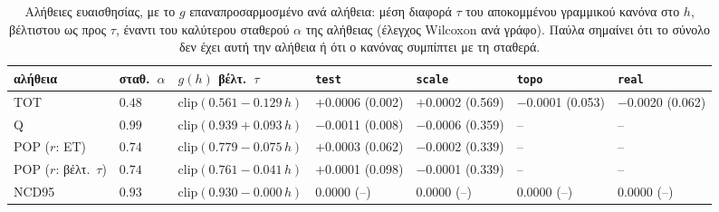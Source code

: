 \begin{table}[!htbp]
\centering
\footnotesize\setlength{\tabcolsep}{4pt}
\caption{Αλήθειες ευαισθησίας, με το $g$ επαναπροσαρμοσμένο ανά αλήθεια: μέση διαφορά $\tau$ του αποκομμένου γραμμικού κανόνα στο $h$, βέλτιστου ως προς $\tau$, έναντι του καλύτερου σταθερού $\alpha$ της αλήθειας (έλεγχος Wilcoxon ανά γράφο). Παύλα σημαίνει ότι το σύνολο δεν έχει αυτή την αλήθεια ή ότι ο κανόνας συμπίπτει με τη σταθερά.}
\label{tab:sens}
\begin{tabular}{@{}lllllll@{}}
\toprule
αλήθεια & σταθ.\ $\alpha$ & $g(h)$ βέλτ.\ $\tau$ & \texttt{test} & \texttt{scale} & \texttt{topo} & \texttt{real} \\
\midrule
TOT & $0.48$ & $\mathrm{clip}(0.561-0.129\,h)$ & $+$0.0006 (0.002) & $+$0.0002 (0.569) & $-$0.0001 (0.053) & $-$0.0020 (0.062) \\
Q & $0.99$ & $\mathrm{clip}(0.939+0.093\,h)$ & $-$0.0011 (0.008) & $-$0.0006 (0.359) & -- & -- \\
POP ($r$: ΕΤ) & $0.74$ & $\mathrm{clip}(0.779-0.075\,h)$ & $+$0.0003 (0.062) & $-$0.0002 (0.339) & -- & -- \\
POP ($r$: βέλτ.\ $\tau$) & $0.74$ & $\mathrm{clip}(0.761-0.041\,h)$ & $+$0.0001 (0.098) & $-$0.0001 (0.339) & -- & -- \\
NCD95 & $0.93$ & $\mathrm{clip}(0.930-0.000\,h)$ & 0.0000 (--) & 0.0000 (--) & 0.0000 (--) & 0.0000 (--) \\
\bottomrule
\end{tabular}
\end{table}
